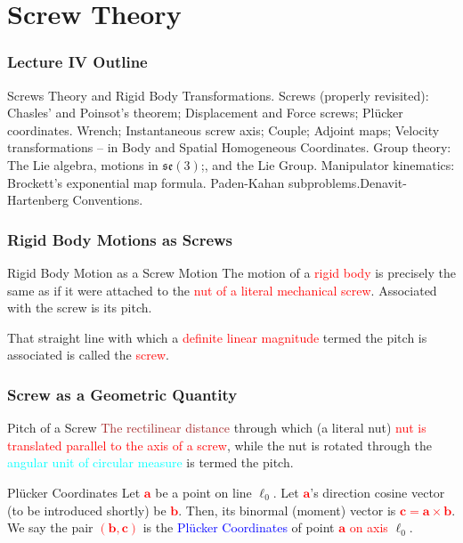 \section{Screw Theory}
\begin{frame}
	\frametitle{Lecture IV Outline}
	\begin{tcolorbox}[coltitle=yellow!50!black,colframe=magenta!25,split=.2,title=Lecture IV Outline]
		Screws Theory and Rigid Body Transformations.
		\tcblower
		Screws (properly revisited): Chasles' and Poinsot's theorem; Displacement and Force screws; Pl{\"u}cker coordinates.
		\vspace{.2cm}
		\newline
		Wrench; Instantaneous screw axis; Couple; Adjoint maps; Velocity transformations -- in Body and Spatial Homogeneous Coordinates.
		\vspace{.2cm}
		\newline
		Group theory: The Lie algebra, motions in $\mathfrak{se}(3)$;, and the Lie Group. 
		\vspace{.2cm}
		\newline
		Manipulator kinematics: Brockett's exponential map formula. Paden-Kahan subproblems.Denavit-Hartenberg Conventions.
	\end{tcolorbox}
\end{frame}

\begin{frame}
	\frametitle{Rigid Body Motions as Screws}
	\begin{block}{Rigid Body Motion as a Screw Motion}
		The motion of a \textcolor{red}{rigid body} is precisely the same as if it were attached to  the \textcolor{red}{nut of a literal mechanical screw}. Associated with the screw is its pitch.
	\end{block}	
	\begin{definition}[Screw]
		That straight line with which a \textcolor{red}{definite linear magnitude} termed the pitch is associated is called the \textcolor{red}{screw}.
	\end{definition}
\end{frame}


\begin{frame}
	\frametitle{Screw as a Geometric Quantity}	
	\begin{block}{Pitch of a Screw}
		\textcolor{brown}{The rectilinear distance}  through which (a literal nut)  \textcolor{red}{nut is translated parallel to the axis of a screw}, while the nut is rotated through the \textcolor{cyan}{angular unit of circular measure} is termed the \textcolor{light-blue}{pitch}.
	\end{block}
	\begin{block}{Pl{\"u}cker Coordinates}
		Let \textcolor{red}{$\bm{a}$} be a point on line $\bm{\ell}_0$. Let \textcolor{red}{$\bm{a}$}'s direction cosine vector (to be introduced shortly) be \textcolor{red}{$\bm{b}$}. Then, its binormal (moment) vector is \textcolor{red}{$\bm{c=a\times b}$}. We say the pair \textcolor{red}{$(\bm{b},\bm{c})$} is the \textcolor{blue}{Pl{\"u}cker Coordinates} of point  \textcolor{red}{$\bm{a}$ on axis} $\bm{\ell}_0$.
	\end{block}	
\end{frame}


